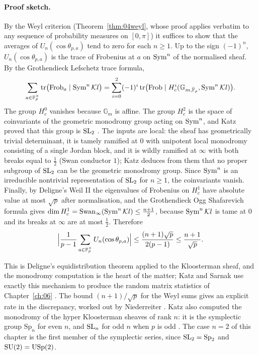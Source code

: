 \paragraph{Proof sketch.} By the Weyl criterion (Theorem~\ref{thm:04weyl}, whose proof applies verbatim to any sequence of probability measures on $[0,\pi]$) it suffices to show that the averages of $U_n(\cos\theta_{p,a})$ tend to zero for each $n\ge1$. Up to the sign $(-1)^n$, $U_n(\cos\theta_{p,a})$ is the trace of Frobenius at $a$ on $\operatorname{Sym}^n$ of the normalised sheaf. By the Grothendieck Lefschetz trace formula,
\[
\sum_{a\in\mathbb{F}_p^\times}\operatorname{tr}\bigl(\operatorname{Frob}_a\mid\operatorname{Sym}^n\mathcal{K}l\bigr)=\sum_{i=0}^2(-1)^i\operatorname{tr}\bigl(\operatorname{Frob}\mid H^i_c(\mathbb{G}_{m,\bar{\mathbb{F}}_p},\operatorname{Sym}^n\mathcal{K}l)\bigr).
\]
The group $H^0_c$ vanishes because $\mathbb{G}_m$ is affine. The group $H^2_c$ is the space of coinvariants of the geometric monodromy group acting on $\operatorname{Sym}^n$, and Katz proved that this group is $\mathrm{SL}_2$ \cite{katz1988}. The inputs are local: the sheaf has geometrically trivial determinant, it is tamely ramified at $0$ with unipotent local monodromy consisting of a single Jordan block, and it is wildly ramified at $\infty$ with both breaks equal to $\frac12$ (Swan conductor $1$); Katz deduces from them that no proper subgroup of $\mathrm{SL}_2$ can be the geometric monodromy group. Since $\operatorname{Sym}^n$ is an irreducible nontrivial representation of $\mathrm{SL}_2$ for $n\ge1$, the coinvariants vanish. Finally, by Deligne's Weil II \cite{deligne1980} the eigenvalues of Frobenius on $H^1_c$ have absolute value at most $\sqrt p$ after normalisation, and the Grothendieck Ogg Shafarevich formula gives $\dim H^1_c=\mathrm{Swan}_\infty(\operatorname{Sym}^n\mathcal{K}l)\le\frac{n+1}2$, because $\operatorname{Sym}^n\mathcal{K}l$ is tame at $0$ and its breaks at $\infty$ are at most $\frac12$. Therefore
\[
\Bigl|\frac{1}{p-1}\sum_{a\in\mathbb{F}_p^\times}U_n(\cos\theta_{p,a})\Bigr|\le\frac{(n+1)\sqrt p}{2(p-1)}\le\frac{n+1}{\sqrt p}.
\]

This is Deligne's equidistribution theorem \cite{deligne1980} applied to the Kloosterman sheaf, and the monodromy computation is the heart of the matter; Katz and Sarnak use exactly this mechanism to produce the random matrix statistics of Chapter~\ref{ch:06} \cite{katzsarnak1999}. The bound $(n+1)/\sqrt p$ for the Weyl sums gives an explicit rate in the discrepancy, worked out by Niederreiter \cite{niederreiter1991}. Katz also computed the monodromy of the hyper Kloosterman sheaves of rank $n$: it is the symplectic group $\mathrm{Sp}_n$ for even $n$, and $\mathrm{SL}_n$ for odd $n$ when $p$ is odd \cite{katz1988}. The case $n=2$ of this chapter is the first member of the symplectic series, since $\mathrm{SL}_2=\mathrm{Sp}_2$ and $\mathrm{SU}(2)=\mathrm{USp}(2)$.

